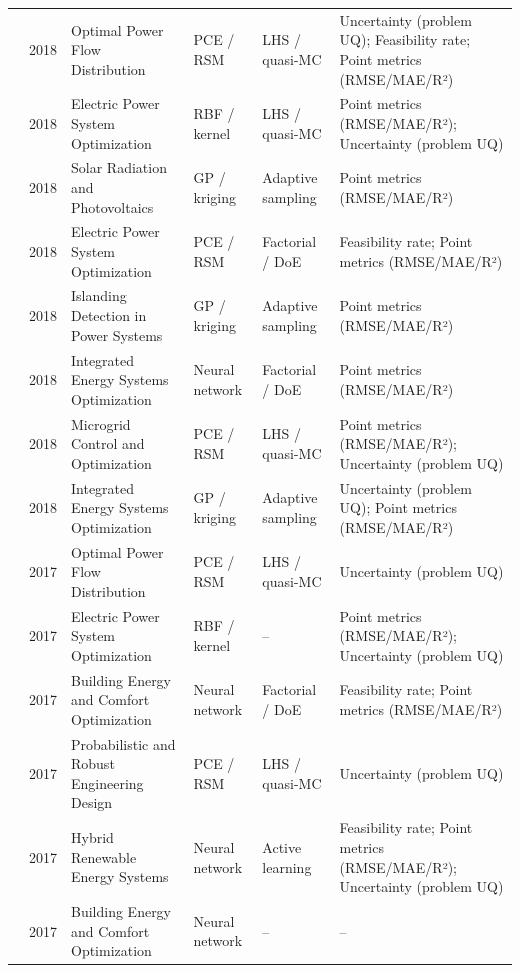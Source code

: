 \begin{longtable}{@{}p{} p{} p{} p{} p{} p{}@{}}
  \cite{Engelmann20186188} & 2018 & Optimal Power Flow Distribution & PCE / RSM & LHS / quasi-MC & Uncertainty (problem UQ); Feasibility rate; Point metrics (RMSE/MAE/R²) \\
  \cite{Han2018622} & 2018 & Electric Power System Optimization & RBF / kernel & LHS / quasi-MC & Point metrics (RMSE/MAE/R²); Uncertainty (problem UQ) \\
  \cite{Kanwal2018117} & 2018 & Solar Radiation and Photovoltaics & GP / kriging & Adaptive sampling & Point metrics (RMSE/MAE/R²) \\
  \cite{Rodgers2018951} & 2018 & Electric Power System Optimization & PCE / RSM & Factorial / DoE & Feasibility rate; Point metrics (RMSE/MAE/R²) \\
  \cite{Shao201858} & 2018 & Islanding Detection in Power Systems & GP / kriging & Adaptive sampling & Point metrics (RMSE/MAE/R²) \\
  \cite{Weinberger2018555} & 2018 & Integrated Energy Systems Optimization & Neural network & Factorial / DoE & Point metrics (RMSE/MAE/R²) \\
  \cite{Xu20184696} & 2018 & Microgrid Control and Optimization & PCE / RSM & LHS / quasi-MC & Point metrics (RMSE/MAE/R²); Uncertainty (problem UQ) \\
  \cite{Zhou20181} & 2018 & Integrated Energy Systems Optimization & GP / kriging & Adaptive sampling & Uncertainty (problem UQ); Point metrics (RMSE/MAE/R²) \\
  \cite{Cao2017} & 2017 & Optimal Power Flow Distribution & PCE / RSM & LHS / quasi-MC & Uncertainty (problem UQ) \\
  \cite{Goudarzi2017667} & 2017 & Electric Power System Optimization & RBF / kernel & -- & Point metrics (RMSE/MAE/R²); Uncertainty (problem UQ) \\
  \cite{Hirvonen2017323} & 2017 & Building Energy and Comfort Optimization & Neural network & Factorial / DoE & Feasibility rate; Point metrics (RMSE/MAE/R²) \\
  \cite{Muhlpfordt20174490} & 2017 & Probabilistic and Robust Engineering Design & PCE / RSM & LHS / quasi-MC & Uncertainty (problem UQ) \\
  \cite{Perera2017187} & 2017 & Hybrid Renewable Energy Systems & Neural network & Active learning & Feasibility rate; Point metrics (RMSE/MAE/R²); Uncertainty (problem UQ) \\
  \cite{Reynolds2017704} & 2017 & Building Energy and Comfort Optimization & Neural network & -- & -- \\

\end{longtable}
